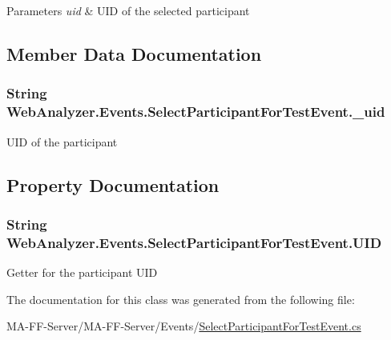 \begin{DoxyParams}{Parameters}
{\em uid} & U\+I\+D of the selected participant\\
\hline
\end{DoxyParams}


\subsection{Member Data Documentation}
\hypertarget{class_web_analyzer_1_1_events_1_1_select_participant_for_test_event_a22ee0c7588156074f32dce220259d041}{}
\subsubsection[{\+\_\+uid}]{\setlength{\rightskip}{0pt plus 5cm}String Web\+Analyzer.\+Events.\+Select\+Participant\+For\+Test\+Event.\+\_\+uid\hspace{0.3cm}{\ttfamily [private]}}\label{class_web_analyzer_1_1_events_1_1_select_participant_for_test_event_a22ee0c7588156074f32dce220259d041}


U\+I\+D of the participant 



\subsection{Property Documentation}
\hypertarget{class_web_analyzer_1_1_events_1_1_select_participant_for_test_event_a1749346fd01c6ff1a5561aa99d797dcc}{}
\subsubsection[{U\+I\+D}]{\setlength{\rightskip}{0pt plus 5cm}String Web\+Analyzer.\+Events.\+Select\+Participant\+For\+Test\+Event.\+U\+I\+D\hspace{0.3cm}{\ttfamily [get]}}\label{class_web_analyzer_1_1_events_1_1_select_participant_for_test_event_a1749346fd01c6ff1a5561aa99d797dcc}


Getter for the participant U\+I\+D 



The documentation for this class was generated from the following file\+:\begin{DoxyCompactItemize}
\item 
M\+A-\/\+F\+F-\/\+Server/\+M\+A-\/\+F\+F-\/\+Server/\+Events/\hyperlink{_select_participant_for_test_event_8cs}{Select\+Participant\+For\+Test\+Event.\+cs}\end{DoxyCompactItemize}
